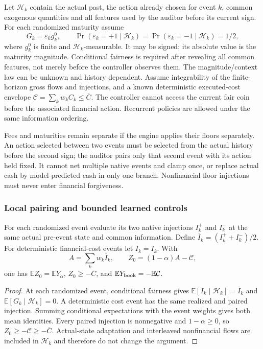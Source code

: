 Let $\mathcal H_k$ contain the actual past, the action already chosen for event $k$, common exogenous quantities and all features used by the auditor before its current sign. For each randomized maturity assume
\[
G_k=\varepsilon_k g_k^0,\qquad
\Pr(\varepsilon_k=+1\mid\mathcal H_k)
=\Pr(\varepsilon_k=-1\mid\mathcal H_k)=1/2,
\]
where $g_k^0$ is finite and $\mathcal H_k$-measurable. It may be signed; its absolute value is the maturity magnitude. Conditional fairness is required after revealing all common features, not merely before the controller observes them. The magnitude/context law can be unknown and history dependent. Assume integrability of the finite-horizon gross flows and injections, and a known deterministic executed-cost envelope
$\mathcal C=\sum_k w_k C_k\le\overline C$.
The controller cannot access the current fair coin before the associated financial action. Recurrent policies are allowed under the same information ordering.

Fees and maturities remain separate if the engine applies their floors separately. An action selected between two events must be selected from the actual history before the second sign; the auditor pairs only that second event with its action held fixed. It cannot net multiple native events and clamp once, or replace actual cash by model-predicted cash in only one branch. Nonfinancial floor injections must never enter financial forgiveness.

\subsubsection{Local pairing and bounded learned controls}
\begin{proposition}
\label{prop:sampleonlyfinancial}
For each randomized event evaluate its two native injections $I_k^+$ and $I_k^-$ at the same actual pre-event state and common information. Define $\overline I_k=(I_k^++I_k^-)/2$. For deterministic financial-cost events let $\overline I_k=I_k$. With
\[
A=\sum_k w_k\overline I_k,\qquad
Z_0=(1-\alpha)A-\mathcal C,
\]
one has $\mathbb EZ_0=\mathbb EY_\alpha$, $Z_0\ge-\overline C$, and
$\mathbb EY_{\rm book}=-\mathbb E\mathcal C$.
\end{proposition}
\begin{proof}
At each randomized event, conditional fairness gives
$\mathbb E[I_k\mid\mathcal H_k]=\overline I_k$ and
$\mathbb E[G_k\mid\mathcal H_k]=0$. A deterministic cost event has the same realized and paired injection. Summing conditional expectations with the event weights gives both mean identities. Every paired injection is nonnegative and $1-\alpha\ge0$, so $Z_0\ge-\mathcal C\ge-\overline C$. Actual-state adaptation and interleaved nonfinancial flows are included in $\mathcal H_k$ and therefore do not change the argument.
\end{proof}

